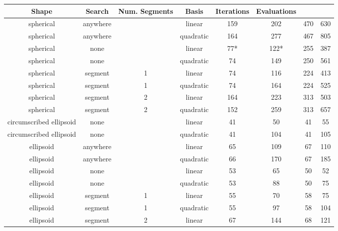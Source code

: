 
\tiny
\begin{center}
\begin{longtable}{ c c c c c c c c }
\label{linear_pathological_results}
Shape & Search & Num. Segments & Basis & Iterations & Evaluations \\
\hline
                spherical &   anywhere &       &     linear & 159  &   202  &  470 &  630 \\
                spherical &   anywhere &       &  quadratic & 164  &   277  &  467 &  805 \\
                spherical &       none &       &     linear &  77* &   122* &  255 &  387 \\
                spherical &       none &       &  quadratic &  74  &   149  &  250 &  561 \\
                spherical &    segment &     1 &     linear &  74  &   116  &  224 &  413 \\
                spherical &    segment &     1 &  quadratic &  74  &   164  &  224 &  525 \\
                spherical &    segment &     2 &     linear & 164  &   223  &  313 &  503 \\
                spherical &    segment &     2 &  quadratic & 152  &   259  &  313 &  657 \\
  circumscribed ellipsoid &       none &       &     linear &  41  &    50  &   41 &   55 \\
  circumscribed ellipsoid &       none &       &  quadratic &  41  &   104  &   41 &  105 \\
                ellipsoid &   anywhere &       &     linear &  65  &   109  &   67 &  110 \\
                ellipsoid &   anywhere &       &  quadratic &  66  &   170  &   67 &  185 \\
                ellipsoid &       none &       &     linear &  53  &    65  &   50 &   52 \\
                ellipsoid &       none &       &  quadratic &  53  &    88  &   50 &   75 \\
                ellipsoid &    segment &     1 &     linear &  55  &    70  &   58 &   75 \\
                ellipsoid &    segment &     1 &  quadratic &  55  &    97  &   58 &  104 \\
                ellipsoid &    segment &     2 &     linear &  67  &   144  &   68 &  121 \\

\end{longtable}
\end{center}
